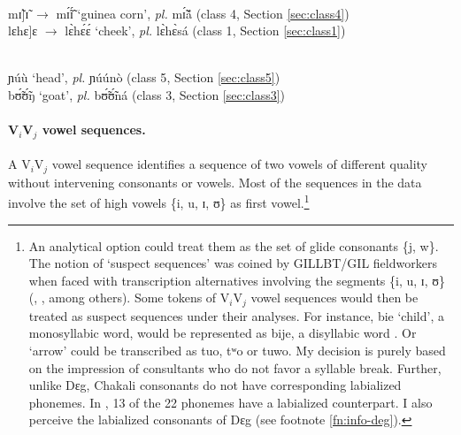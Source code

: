 \begin{exe}
\ex\label{ex:V1V1vowel-seq}
\begin{xlist}

\ex  {\rm V$_{i}$]-V$_{i}$: a morpheme boundary intervenes} \\
 mɪ̃]ɪ̃ $\rightarrow$ mɪ̃́ɪ̃́  {\rm `guinea corn'}, {\it pl.} mɪ̃́ã́  {\rm 
 ({\sc class 4}, Section \ref{sec:class4})} \\
  lɛhɛ]ɛ  $\rightarrow$  lɛ̀hɛ́ɛ́  {\rm `cheek'},  {\it pl.}   lɛ̀hɛ̀sá  
{\rm ({\sc class 1},  Section \ref{sec:class1})}


 \\
ɲúù {\rm  `head'}, {\it pl.} ɲúúnò {\rm  ({\sc class 5}, Section 
\ref{sec:class5})}\\	
bʊ̃́ʊ̃́ŋ	 {\rm  `goat'}, {\it pl.} bʊ̃́ʊ̃́ná  
{\rm  ({\sc class 3}, Section \ref{sec:class3})}
\end{xlist}
\end{exe}






\paragraph{V$_{i}$V$_{j}$ vowel sequences.}
\label{sec:V1V2vowel-seq}

A V$_{i}$V$_{j}$ vowel sequence identifies a sequence of two vowels of different 
quality without intervening consonants or vowels. Most of the sequences in the 
data involve  the set of high vowels \{{\sls i, u, ɪ, ʊ}\}  as first 
vowel.\footnote{\label{fn:deg-labial} An analytical option could treat them as 
the set of glide consonants \{{\sls j, w}\}.  The notion of  `suspect 
sequences' 
was coined by GILLBT/GIL fieldworkers when faced with  transcription 
alternatives involving the segments  \{{\sls i, u, ɪ, ʊ}\} (\cite[4]{Gray69}, 
\citealt[8]{Toup95}, among others).  Some  tokens of V$_{i}$V$_{j}$ vowel 
sequences  would then be treated as suspect sequences under their analyses. For 
instance, {\sls bie} `child', a monosyllabic word,  would be represented as 
{\sls 
bije}, a disyllabic word \citep[see also][100]{Kedr97}. Or `arrow' could be 
transcribed as {\sls tuo}, {\sls tʷo} or {\sls tuwo}.  My decision is purely 
based 
on the impression of  consultants who do not favor a syllable break.  Further, 
unlike  Dɛg, Chakali consonants do not have corresponding  labialized  phonemes. 
In \citet[2]{Crou03},  13 of the 22 phonemes have a labialized 
counterpart. I also perceive the labialized consonants of Dɛg (see footnote 
\ref{fn:info-deg}).}

